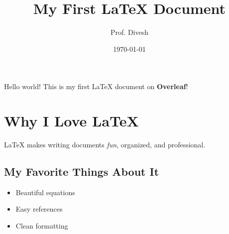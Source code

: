 \documentclass{article}
\title{My First LaTeX Document}
\author{Prof. Divesh}
\date{\today}
\begin{document}
\maketitle

Hello world! This is my first LaTeX document on \textbf{Overleaf}!

\section{Why I Love LaTeX}
LaTeX makes writing documents \textit{fun}, organized, and professional.

\subsection{My Favorite Things About It}
\begin{itemize}
  \item Beautiful equations
  \item Easy references
  \item Clean formatting
\end{itemize}
\end{document}
